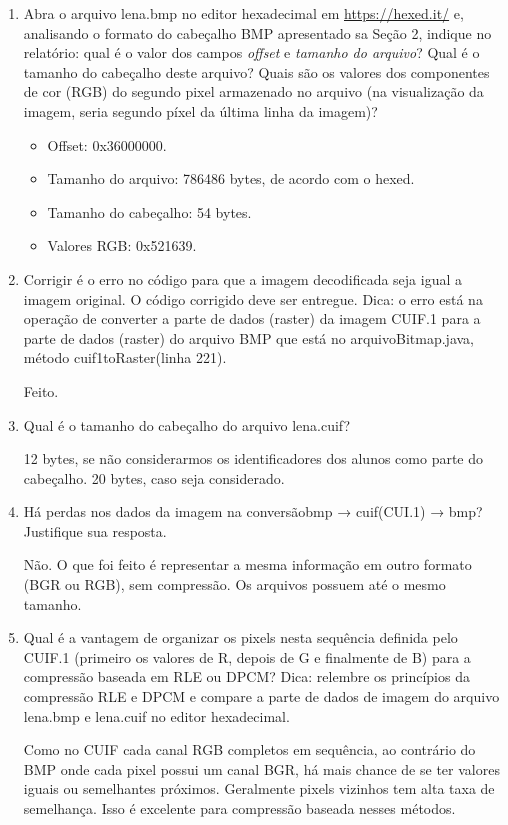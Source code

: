 \documentclass[12pt, a4paper, oneside]{abntex2}
\begin{document}
    \printcoverufsc

    \begin{enumerate}
        \item Abra o arquivo lena.bmp no editor hexadecimal em \href{https://hexed.it/}{https://hexed.it/} e, analisando o formato do cabeçalho BMP apresentado sa Seção 2, indique no relatório: qual é o valor dos campos \textit{offset} e \textit{tamanho do arquivo}?
            Qual é o tamanho do cabeçalho deste arquivo?
            Quais são os valores dos componentes de cor (RGB) do segundo pixel armazenado no arquivo (na visualização da imagem, seria segundo píxel da última linha da imagem)?

            \begin{itemize}
                \item Offset: 0x36000000.
                \item Tamanho do arquivo: 786486 bytes, de acordo com o hexed.
                \item Tamanho do cabeçalho: 54 bytes.
                \item Valores RGB: 0x521639.
            \end{itemize}

        \item Corrigir é o erro no código para que a imagem decodificada seja igual a imagem original.
            O código corrigido deve ser entregue.
            Dica: o erro está na operação de converter a parte de dados (raster) da imagem CUIF.1 para a parte de dados (raster) do arquivo BMP que está no arquivoBitmap.java, método cuif1toRaster(linha 221).

            Feito.

        \item Qual é o tamanho do cabeçalho do arquivo lena.cuif?

                12 bytes, se não considerarmos os identificadores dos alunos como parte do cabeçalho.
                20 bytes, caso seja considerado.

        \item Há perdas nos dados da imagem na conversãobmp → cuif(CUI.1) → bmp?
                Justifique sua resposta.

                Não.
                O que foi feito é representar a mesma informação em outro formato (BGR ou RGB), sem compressão.
                Os arquivos possuem até o mesmo tamanho.

        \item Qual é a vantagem de organizar os pixels nesta sequência definida pelo CUIF.1 (primeiro os valores de R, depois de G e finalmente de B) para a compressão baseada em RLE ou DPCM? Dica: relembre os princípios da compressão RLE e DPCM e compare a parte de dados de imagem do arquivo lena.bmp e lena.cuif no editor hexadecimal.

                Como no CUIF cada canal RGB completos em sequência, ao contrário do BMP onde cada pixel possui um canal BGR, há mais chance de se ter valores iguais ou semelhantes próximos.
                Geralmente pixels vizinhos tem alta taxa de semelhança.
                Isso é excelente para compressão baseada nesses métodos.
    \end{enumerate}
\end{document}
